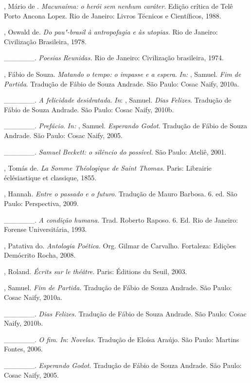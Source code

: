 \begin{Parskip}
, Mário de . \emph{Macunaíma: o herói sem nenhum caráter}. Edição crítica de
Telê Porto Ancona Lopez. Rio de Janeiro: Livros Técnicos e Científicos, 1988.

, Oswald de. \emph{Do pau"-brasil à antropofagia e às utopias.} Rio
de Janeiro: Civilização Brasileira, 1978.

\_\_\_\_\_\_. \emph{Poesias Reunidas.} Rio de Janeiro: Civilização brasileira, 1974.

, Fábio de Souza. \emph{Matando o tempo: o impasse e a espera}.
\emph{In:} , Samuel. \emph{Fim de Partida}. Tradução de Fábio de
Souza Andrade. São Paulo: Cosac Naify, 2010a.

\_\_\_\_\_\_. \emph{A felicidade desidratada}. \emph{In}: , Samuel.
\emph{Dias Felizes}. Tradução de Fábio de Souza Andrade. São Paulo: Cosac Naify, 2010b.

\_\_\_\_\_\_. \emph{Prefácio}. \emph{In:} , Samuel.
\emph{Esperando Godot}. Tradução de Fábio de Souza Andrade. São Paulo: Cosac Naify, 2005.

\_\_\_\_\_\_. \emph{Samuel Beckett: o silêncio do possível.} São Paulo: Ateliê, 2001.

, Tomás de. \emph{La Somme Théologique de Saint Thomas.} Paris:
Librairie éclésiastique et classique, 1855.

, Hannah. \emph{Entre o passado e o futuro}. Tradução de Mauro
Barbosa. 6. ed. São Paulo: Perspectiva, 2009.

\_\_\_\_\_\_. \emph{A condição humana}. Trad. Roberto Raposo. 6. Ed.
Rio de Janeiro: Forense Universitária, 1993.

, Patativa do. \emph{Antologia Poética.} Org. Gilmar de
Carvalho. Fortaleza: Edições Demócrito Rocha, 2008.

, Roland. \emph{Écrits sur le théâtre}. Paris: Éditions du
Seuil, 2003.

, Samuel. \emph{Fim de Partida}. Tradução de Fábio de Souza Andrade.
São Paulo: Cosac Naify, 2010a.

\_\_\_\_\_\_. \emph{Dias Felizes.} Tradução de Fábio de Souza Andrade. São Paulo: Cosac Naify, 2010b.

\_\_\_\_\_\_. \emph{O fim}. \emph{In}: \emph{Novelas.} Tradução de Eloísa
Araújo. São Paulo: Martins Fontes, 2006.

\_\_\_\_\_\_. \emph{Esperando Godot}. Tradução de Fábio de Souza Andrade. São
Paulo: Cosac Naify, 2005.


\end{Parskip}
